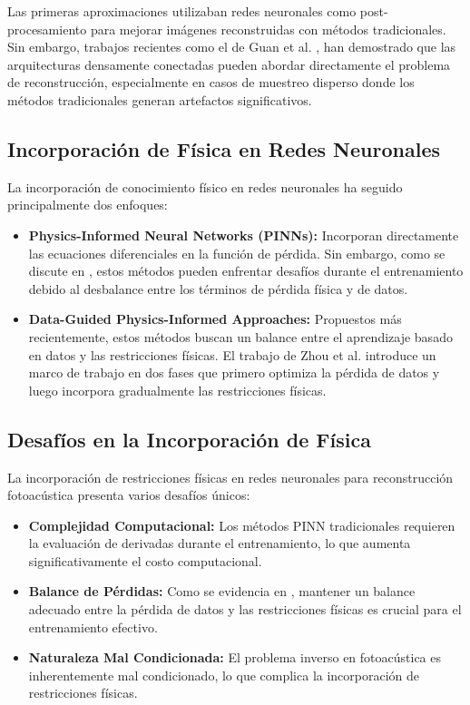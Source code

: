 Las primeras aproximaciones utilizaban redes neuronales como post-procesamiento para mejorar imágenes reconstruidas con métodos tradicionales. Sin embargo, trabajos recientes como el de Guan et al. \cite{guan2020fully}, han demostrado que las arquitecturas densamente conectadas pueden abordar directamente el problema de reconstrucción, especialmente en casos de muestreo disperso donde los métodos tradicionales generan artefactos significativos.

\subsection{Incorporación de Física en Redes Neuronales}

La incorporación de conocimiento físico en redes neuronales ha seguido principalmente dos enfoques:

\begin{itemize}
\item \textbf{Physics-Informed Neural Networks (PINNs):} Incorporan directamente las ecuaciones diferenciales en la función de pérdida. Sin embargo, como se discute en \cite{Zhou2024DataGuided}, estos métodos pueden enfrentar desafíos durante el entrenamiento debido al desbalance entre los términos de pérdida física y de datos.

\item \textbf{Data-Guided Physics-Informed Approaches:} Propuestos más recientemente, estos métodos buscan un balance entre el aprendizaje basado en datos y las restricciones físicas. El trabajo de Zhou et al. \cite{Zhou2024DataGuided} introduce un marco de trabajo en dos fases que primero optimiza la pérdida de datos y luego incorpora gradualmente las restricciones físicas.
\end{itemize}

\subsection{Desafíos en la Incorporación de Física}

La incorporación de restricciones físicas en redes neuronales para reconstrucción fotoacústica presenta varios desafíos únicos:

\begin{itemize}
\item \textbf{Complejidad Computacional:} Los métodos PINN tradicionales requieren la evaluación de derivadas durante el entrenamiento, lo que aumenta significativamente el costo computacional.

\item \textbf{Balance de Pérdidas:} Como se evidencia en \cite{Zhou2024DataGuided}, mantener un balance adecuado entre la pérdida de datos y las restricciones físicas es crucial para el entrenamiento efectivo.

\item \textbf{Naturaleza Mal Condicionada:} El problema inverso en fotoacústica es inherentemente mal condicionado, lo que complica la incorporación de restricciones físicas.
\end{itemize}

